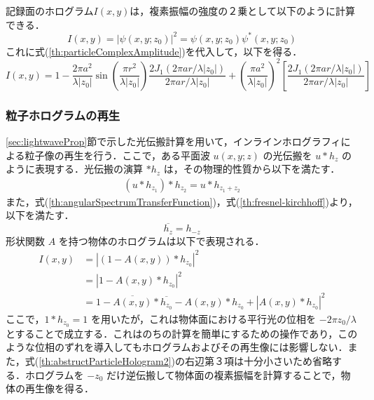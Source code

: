 記録面のホログラム$I(x,y)$は，複素振幅の強度の２乗として以下のように計算できる．
\begin{equation}
    \label{th:irradiance}
    I(x,y) = |\psi(x,y;z_0)|^2 = \psi(x,y;z_0)\psi^*(x,y;z_0)
\end{equation}
これに式(\ref{th:particleComplexAmplitude})を代入して，以下を得る\cite{tyler1976}．
\begin{equation}
    \label{th:particleIrradiance}
    I(x,y) = 1 - \frac{2\pi a^2}{\lambda |z_0|} \sin{\left( \frac{\pi r^2}{\lambda |z_0|} \right)} \frac{2J_1(2\pi ar/\lambda |z_0|)}{2\pi ar / \lambda |z_0|} + \left( \frac{\pi a^2}{\lambda |z_0|} \right)^2 \left[ \frac{2J_1(2\pi ar/\lambda |z_0|)}{2\pi ar / \lambda |z_0|} \right]
\end{equation}

\subsubsection{粒子ホログラムの再生}\label{sec:holographicReconstruction}
\ref{sec:lightwaveProp}節で示した光伝搬計算を用いて，インラインホログラフィによる粒子像の再生を行う．ここで，ある平面波 $u(x,y;z)$ の光伝搬を $u*h_z$ のように表現する．光伝搬の演算 $*h_z$ は，その物理的性質から以下を満たす．
\begin{align}
    \label{th:lightPropOperation}
    \left( u * h_{z_1} \right) * h_{z_2} = u * h_{z_1 + z_2}
\end{align}
また，式(\ref{th:angularSpectrumTransferFunction})，式(\ref{th:fresnel-kirchhoff})より，以下を満たす．
\begin{equation}
    \label{th:lightPropOperation2}
    \overline{h_z} = h_{-z}
\end{equation}
形状関数 $A$ を持つ物体のホログラムは以下で表現される\cite{scott1987}．
\begin{align}
    \label{th:abstructParticleHologram}
    I(x,y) &= \left| \left( 1 - A(x,y) \right) * h_{z_0} \right|^2 \\
    &= \left|  1 - A(x,y)  * h_{z_0} \right|^2 \\
    \label{th:abstructParticleHologram2}
    &= 1 - \overline{A(x,y)}*\overline{h_{z_0}} - A(x,y)*h_{z_0} + \left| A(x,y) * h_{z_0} \right|^2
\end{align}
ここで，$1*h_{z_0}=1$ を用いたが，これは物体面における平行光の位相を $-2\pi z_0 /\lambda$ とすることで成立する．これはのちの計算を簡単にするための操作であり，このような位相のずれを導入してもホログラムおよびその再生像には影響しない．また，式(\ref{th:abstructParticleHologram2})の右辺第３項は十分小さいため省略する．ホログラムを $-z_0$ だけ逆伝搬して物体面の複素振幅を計算することで，物体の再生像を得る．
